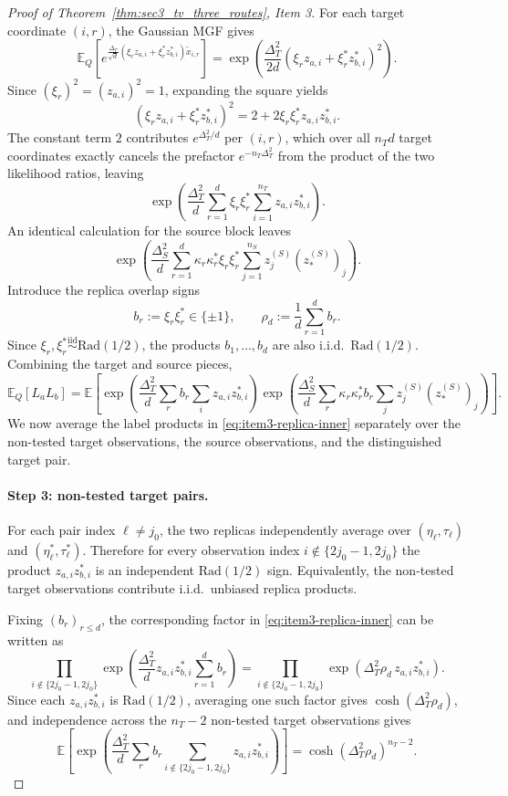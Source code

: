 \documentclass[10pt]{article}
\newcommand{\Ebb}{\mathbb E}
\newcommand{\trg}{T}
\newcommand{\nT}{n_{\trg}}
\newcommand{\DeltaT}{\Delta_{\trg}}
\newcommand{\src}{S}
\newcommand{\nS}{n_{\src}}
\newcommand{\zsrc}{z^{(\src)}}
\newcommand{\DeltaS}{\Delta_{\src}}
\begin{document}
\begin{proof}[Proof of Theorem~\ref{thm:sec3_tv_three_routes}, Item 3]
For each target coordinate $(i,r)$, the Gaussian MGF gives
\[
    \Ebb_Q\!\left[e^{\frac{\DeltaT}{\sqrt{d}}(\xi_r z_{a,i}+\xi_r^* z_{b,i}^*)\tilde x_{i,r}}\right]
    =
    \exp\!\left(\frac{\DeltaT^2}{2d}(\xi_r z_{a,i}+\xi_r^* z_{b,i}^*)^2\right).
\]
Since $(\xi_r)^2=(z_{a,i})^2=1$, expanding the square yields
\[
    (\xi_r z_{a,i}+\xi_r^* z_{b,i}^*)^2
    =
    2+2\xi_r\xi_r^* z_{a,i}z_{b,i}^*.
\]
The constant term $2$ contributes $e^{\DeltaT^2/d}$ per $(i,r)$, which over
all $\nT d$ target coordinates exactly cancels the prefactor
$e^{-\nT\DeltaT^2}$ from the product of the two likelihood ratios, leaving
\[
    \exp\!\left(\frac{\DeltaT^2}{d}\sum_{r=1}^d\xi_r\xi_r^*\sum_{i=1}^{\nT}z_{a,i}z_{b,i}^*\right).
\]
An identical calculation for the source block leaves
\[
    \exp\!\left(\frac{\DeltaS^2}{d}\sum_{r=1}^d\kappa_r\kappa_r^*\xi_r\xi_r^*\sum_{j=1}^{\nS}\zsrc_j (\zsrc_*)_j\right).
\]
Introduce the replica overlap signs
\[
    b_r:=\xi_r\xi_r^*\in\{\pm1\},
    \qquad
    \rho_d:=\frac{1}{d}\sum_{r=1}^d b_r.
\]
Since $\xi_r,\xi_r^*\overset{\mathrm{iid}}{\sim}\mathrm{Rad}(1/2)$, the
products $b_1,\ldots,b_d$ are also i.i.d.\ $\mathrm{Rad}(1/2)$. Combining the
target and source pieces,
\begin{equation}
\label{eq:item3-replica-inner}
    \Ebb_Q[L_aL_b]
    =
    \Ebb\!\left[
        \exp\!\left(\frac{\DeltaT^2}{d}\sum_r b_r\sum_i z_{a,i}z_{b,i}^*\right)
        \exp\!\left(\frac{\DeltaS^2}{d}\sum_r\kappa_r\kappa_r^* b_r\sum_j\zsrc_j (\zsrc_*)_j\right)
    \right].
\end{equation}
We now average the label products in
\eqref{eq:item3-replica-inner} separately over the non-tested target
observations, the source observations, and the distinguished target pair.

\paragraph{Step 3: non-tested target pairs.}
For each pair index $\ell\neq j_0$, the two replicas independently average over
$(\eta_\ell,\tau_\ell)$ and $(\eta_\ell^*,\tau_\ell^*)$. Therefore for every
observation index $i\notin\{2j_0-1,2j_0\}$ the product $z_{a,i}z_{b,i}^*$ is an
independent $\mathrm{Rad}(1/2)$ sign. Equivalently, the non-tested target
observations contribute i.i.d.\ unbiased replica products.

Fixing $(b_r)_{r\le d}$, the corresponding factor in
\eqref{eq:item3-replica-inner} can be written as
\[
    \prod_{i\notin\{2j_0-1,2j_0\}}
    \exp\!\left(\frac{\DeltaT^2}{d}z_{a,i}z_{b,i}^*\sum_{r=1}^d b_r\right)
    =
    \prod_{i\notin\{2j_0-1,2j_0\}}
    \exp\!\left(\DeltaT^2\rho_d\, z_{a,i}z_{b,i}^*\right).
\]
Since each $z_{a,i}z_{b,i}^*$ is $\mathrm{Rad}(1/2)$, averaging one such factor
gives $\cosh(\DeltaT^2\rho_d)$, and independence across the $\nT-2$
non-tested target observations gives
\[
    \Ebb\!\left[\exp\!\left(\frac{\DeltaT^2}{d}\sum_r b_r\sum_{i\notin\{2j_0-1,2j_0\}}z_{a,i}z_{b,i}^*\right)\right]
    =
    \cosh(\DeltaT^2\rho_d)^{\nT-2}.
\]


\end{proof}
\end{document}
